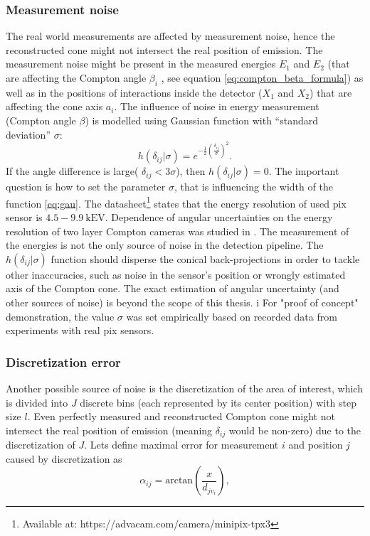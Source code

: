 \subsubsection{Measurement noise}
The real world measurements are affected by measurement noise, hence the reconstructed cone might not intersect the real position of emission.
The measurement noise might be present in the measured energies $E_{1}$ and $E_{2}$ (that are affecting the Compton angle $\beta_{i}$ , see equation \ref{eq:compton_beta_formula}) 
as well as in the positions of interactions inside the detector ($X_{1}$ and $X_{2}$) 
that are affecting the cone axis $a_{i}$.
The influence of noise in energy measurement (Compton angle $\beta$) is modelled using Gaussian function with ``standard deviation'' $\sigma$:
\begin{equation}
  h(\delta_{ij}|\sigma) = e^{-\frac{1}{2}(\frac{\delta_{ij}}{\sigma})^{2}}.
  \label{eq:gau}
\end{equation}
If the angle difference is large( $\delta_{ij}<3\sigma$), then $h(\delta_{ij}|\sigma) = 0$.
The important question is how to set the parameter $\sigma$, that is influencing the width of the function \ref{eq:gau}.
The datasheet\footnote{Available at: https://advacam.com/camera/minipix-tpx3}
states that the energy resolution of used \ac{pix} sensor is $4.5 - 9.9\ \mathrm{kEV}$. 
Dependence of angular uncertainties on the energy resolution of two layer Compton cameras was studied in \cite{ordonez}.
The measurement of the energies is not the only source of noise in the detection pipeline.
The $h(\delta_{ij}|\sigma)$ function should disperse the conical back-projections in order to tackle other inaccuracies, such as noise in the sensor's position or wrongly estimated axis of the Compton cone. 
The exact estimation of angular uncertainty (and other sources of noise) is beyond the scope of this thesis.
i%
For "proof of concept" demonstration, the value $\sigma$ was set empirically based on recorded data from experiments with real \ac{pix} sensors.

\subsubsection{Discretization error}
Another possible source of noise is the discretization of the area of interest, which is divided into $J$ discrete bins (each represented by its center position) with step size $l$.
Even perfectly measured and reconstructed Compton cone might not intersect the real position of emission (meaning $\delta_{ij}$ would be non-zero) due to the discretization of $J$.
Lets define maximal error for measurement $i$ and position $j$ caused by discretization as
\begin{equation}
  \alpha_{ij} = \mathrm{arctan}(\frac{x}{d_{jv_{i}}}),
  \label{eq:alpha}
\end{equation}

